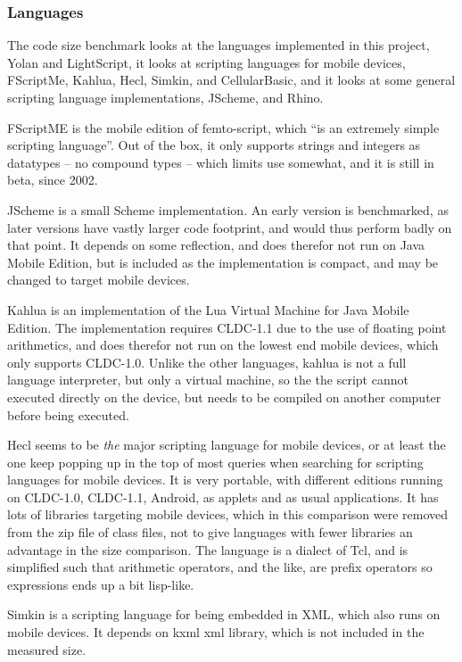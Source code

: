 \documentclass[11pt]{report}
\begin{document}
\subsubsection{Languages}
\label{codefootprint-languages}
The code size benchmark looks at the languages implemented in this project, Yolan and LightScript, it looks at scripting languages for mobile devices, FScriptMe, Kahlua, Hecl, Simkin, and CellularBasic, and it looks at some general scripting language implementations,  JScheme, and Rhino.

FScriptME\cite{fscriptme} is the mobile edition of femto-script, which ``is an extremely simple scripting language''\cite{fscript}. 
Out of the box, it only supports strings and integers as datatypes -- no compound types -- which limits use somewhat, and it is still in beta, since 2002. 

JScheme\cite{jscheme} is a small Scheme implementation. An early version is benchmarked, as later versions have vastly larger code footprint, and would thus perform badly on that point. It depends on some reflection, and does therefor not run on Java Mobile Edition, but is included as the implementation is compact, and may be changed to target mobile devices.

Kahlua\cite{kahlua} is an implementation of the Lua Virtual Machine for Java Mobile Edition. 
The implementation requires CLDC-1.1 due to the use of floating point arithmetics, and does therefor not run on the lowest end mobile devices, which only supports CLDC-1.0.
Unlike the other languages, kahlua is not a full language interpreter, but only a virtual machine, so the the script cannot executed directly on the device, but needs to be compiled on another computer before being executed.

Hecl\cite{hecl} seems to be \emph{the} major scripting language for mobile devices, or at least the one keep popping up in the top of most queries when searching for scripting languages for mobile devices.
It is very portable, with different editions running on CLDC-1.0, CLDC-1.1, Android, as applets and as usual applications.
It has lots of libraries targeting mobile devices, which in this comparison were removed from the zip file of class files, not to give languages with fewer libraries an advantage in the size comparison.
The language is a dialect of Tcl, and is simplified such that arithmetic operators, and the like, are prefix operators so expressions ends up a bit lisp-like.

Simkin\cite{simkin} is a scripting language for being embedded in XML, which also runs on mobile devices. It depends on kxml xml library, which is not included in the measured size. 
\end{document}
